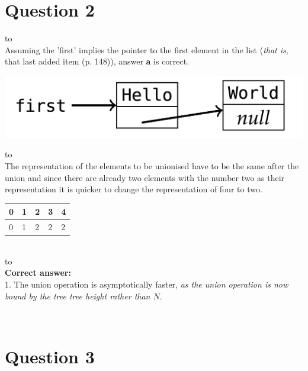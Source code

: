 \documentclass[a4paper]{article}
\def\headline#1{\hbox to \hsize{\hrulefill\quad\lower.3em\hbox{#1}\quad\hrulefill}}
\begin{document}
\section*{Question 2}
\headline{a} \ \\

\noindent
Assuming the 'first' implies the pointer to the first element in the list 
(\textit{that is}, that last added item (p. 148)), answer \textbf{a} is correct.
\ \\

\begin{center}
\includegraphics[scale=0.22]{figure2.png}
\end{center}

\headline{b} \ \\

\noindent
The representation of the elements to be unionised have to be the same after the union and since there are already two elements with the number two as their representation it is quicker to change the representation of four to two.\\
\begin{center}
\begin{tabular}{|l|l|l|l|l|}
\hline
\textbf{0} & \textbf{1} & \textbf{2} & \textbf{3} & \textbf{4}\\ 
\hline
0 & 1 & 2 & 2 & 2\\
\hline
\end{tabular}
\end{center}
\ \\

\headline{c} \ \\

\noindent
\textbf{Correct answer:} \\
1. The union operation is asymptotically faster, \textit{as the union operation is now bound by the tree tree height rather than
$N$}.



\ \\

\section*{Question 3}
\end{document}
